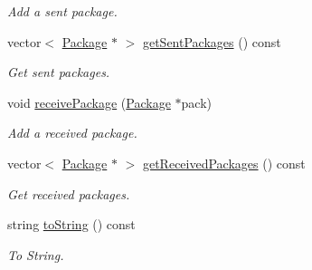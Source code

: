 \begin{DoxyCompactItemize}
\begin{DoxyCompactList}\small\item\em Add a sent package. \end{DoxyCompactList}\item 
vector$<$ \hyperlink{classPackage}{Package} $\ast$ $>$ \hyperlink{classClient_aff47cd6d18feba4c43f7ff495d73f495}{get\+Sent\+Packages} () const 
\begin{DoxyCompactList}\small\item\em Get sent packages. \end{DoxyCompactList}\item 
void \hyperlink{classClient_a1726c784a1c19701a13e12333cf906e5}{receive\+Package} (\hyperlink{classPackage}{Package} $\ast$pack)
\begin{DoxyCompactList}\small\item\em Add a received package. \end{DoxyCompactList}\item 
vector$<$ \hyperlink{classPackage}{Package} $\ast$ $>$ \hyperlink{classClient_aae2dee02f0951f418941234103c275ef}{get\+Received\+Packages} () const 
\begin{DoxyCompactList}\small\item\em Get received packages. \end{DoxyCompactList}\item 
string \hyperlink{classClient_a994ff91075daf477725ca055874e3e22}{to\+String} () const 
\begin{DoxyCompactList}\small\item\em To String. \end{DoxyCompactList}\end{DoxyCompactItemize}
